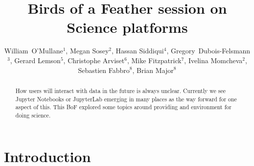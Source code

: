 \documentclass[11pt,twoside]{article}
\begin{document}
\title{Birds of a Feather session on Science platforms}

\author{William~O'Mullane$^1$,
Megan Sosey$^2$,
Hassan Siddiqui$^4$,
Gregory~Dubois-Felsmann$^3$,
Gerard Lemson$^5$,
Christophe Arviset$^6$,
Mike Fitzpatrick$^7$,
Ivelina Momcheva$^2$,
Sebastien Fabbro$^8$,
Brian Major$^8$
}


\begin{abstract}
How users will interact with data in the future is always unclear.  Currently we see Jupyter Notebooks or JupyterLab emerging in many places as the way forward for one aspect of this.  This BoF explored some topics around providing and environment for doing science.

\end{abstract}

\section{Introduction}
\end{document}
